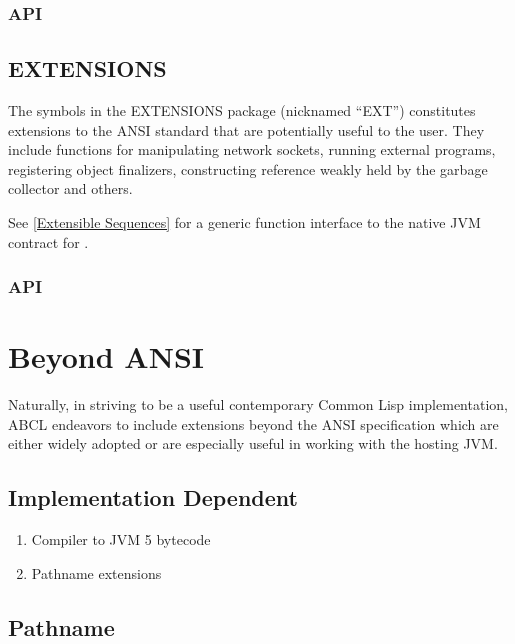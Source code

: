 \documentclass[10pt]{book}
\begin{document}
\subsection{API}



\section{EXTENSIONS}

The symbols in the EXTENSIONS package (nicknamed ``EXT'') constitutes
extensions to the ANSI standard that are potentially useful to the
user.  They include functions for manipulating network sockets,
running external programs, registering object finalizers, constructing
reference weakly held by the garbage collector and others.

See \ref{Extensible Sequences} for a generic function interface to
the native JVM contract for .

\subsection{API}



\chapter{Beyond ANSI}

Naturally, in striving to be a useful contemporary Common Lisp
implementation, ABCL endeavors to include extensions beyond the ANSI
specification which are either widely adopted or are especially useful
in working with the hosting JVM.

\section{Implementation Dependent}
\begin{enumerate}
  \item Compiler to JVM 5 bytecode
  \item Pathname extensions
\end{enumerate}

\section{Pathname}
\end{document}
